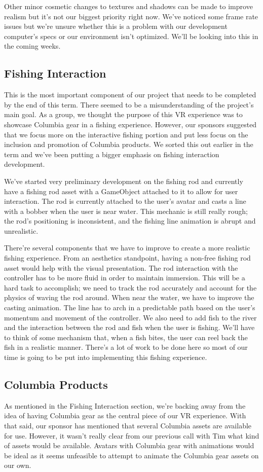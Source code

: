 \documentclass[10pt,journal,compsoc,onecolumn, draftclsnofoot]{IEEEtran}
\begin{document}
Other minor cosmetic changes to textures and shadows can be made to improve realism but it's not our biggest priority right now. We've noticed some frame rate issues but we're unsure whether this is a problem with our development computer's specs or our environment isn't optimized. We'll be looking into this in the coming weeks.

\subsection{Fishing Interaction}
This is the most important component of our project that needs to be completed by the end of this term. There seemed to be a misunderstanding of the project's main goal. As a group, we thought the purpose of this VR experience was to showcase Columbia gear in a fishing experience. However, our sponsors suggested that we focus more on the interactive fishing portion and put less focus on the inclusion and promotion of Columbia products. We sorted this out earlier in the term and we've been putting a bigger emphasis on fishing interaction development.

We've started very preliminary development on the fishing rod and currently have a fishing rod asset with a GameObject attached to it to allow for user interaction. The rod is currently attached to the user's avatar and casts a line with a bobber when the user is near water. This mechanic is still really rough; the rod's positioning is inconsistent, and the fishing line animation is abrupt and unrealistic.

There're several components that we have to improve to create a more realistic fishing experience. From an aesthetics standpoint, having a non-free fishing rod asset would help with the visual presentation. The rod interaction with the controller has to be more fluid in order to maintain immersion. This will be a hard task to accomplish; we need to track the rod accurately and account for the physics of waving the rod around. When near the water, we have to improve the casting animation. The line has to arch in a predictable path based on the user's momentum and movement of the controller. We also need to add fish to the river and the interaction between the rod and fish when the user is fishing. We'll have to think of some mechanism that, when a fish bites, the user can reel back the fish in a realistic manner. There's a lot of work to be done here so most of our time is going to be put into implementing this fishing experience.

\subsection{Columbia Products}
As mentioned in the Fishing Interaction section, we're backing away from the idea of having Columbia gear as the central piece of our VR experience. With that said, our sponsor has mentioned that several Columbia assets are available for use. However, it wasn't really clear from our previous call with Tim what kind of assets would be available. Avatars with Columbia gear with animations would be ideal as it seems unfeasible to attempt to animate the Columbia gear assets on our own.
\end{document}
